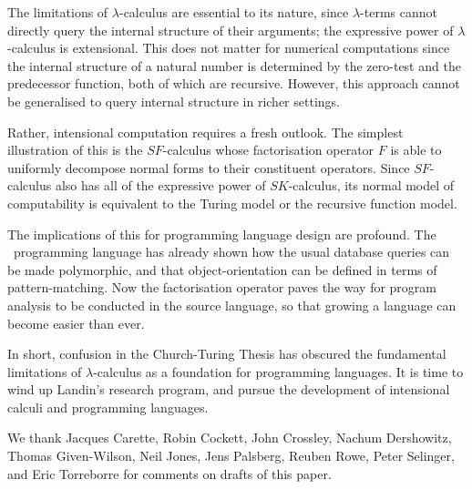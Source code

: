 \documentclass[a4paper]{article}
\begin{document}
The limitations of $\lambda$-calculus are essential to its nature, since
$\lambda$-terms cannot directly query the internal structure of their
arguments; the expressive power of $\lambda$-calculus is extensional. This
does not matter for numerical computations since the internal
structure of a natural number is determined by the zero-test and the
predecessor function, both of which are recursive.  However, this
approach cannot be generalised to query internal structure in richer
settings.

Rather, intensional computation requires a fresh outlook. The simplest
illustration of this is the $SF$-calculus whose factorisation operator
$F$ is able to uniformly decompose normal forms to their constituent
operators.  Since $SF$-calculus also has all of the expressive power
of $SK$-calculus, its normal model of computability is equivalent to
the Turing model or the recursive function model.

The implications of this for programming language design are profound.
The \bondi\ programming language has already shown how the usual
database queries can be made polymorphic, and that object-orientation
can be defined in terms of pattern-matching.  Now the factorisation
operator paves the way for program analysis to be conducted in the
source language, so that growing a language can become easier than
ever.

In short, confusion in the Church-Turing Thesis has obscured the
fundamental limitations of $\lambda$-calculus as a foundation for
programming languages.  It is time to wind up Landin's research
program, and pursue the development of intensional calculi and
programming languages.


\medskip

 We thank Jacques Carette, Robin Cockett, John Crossley,
Nachum Dershowitz, Thomas Given-Wilson, Neil Jones, Jens Palsberg, Reuben Rowe,
Peter Selinger, and Eric Torreborre for comments on drafts of this paper.

 

\newpage 
\tableofcontents
\end{document}

